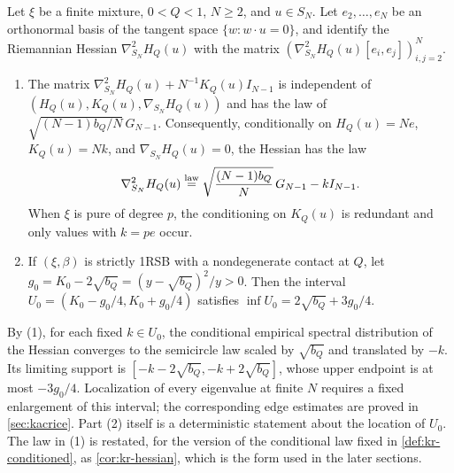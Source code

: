 \begin{lemma}\label{lem:th-hessian}
Let $\xi$ be a finite mixture, $0<Q<1$, $N\ge2$, and $u\in S_N$. Let $e_2,\dots,e_N$ be an orthonormal basis of the tangent space $\{w:w\cdot u=0\}$, and identify the Riemannian Hessian $\nabla^2_{S_N}H_Q(u)$ with the matrix $(\nabla^2_{S_N}H_Q(u)[e_i,e_j])_{i,j=2}^N$.
\begin{enumerate}
\item The matrix $\nabla^2_{S_N}H_Q(u)+N^{-1}K_Q(u)I_{N-1}$ is independent of $(H_Q(u),K_Q(u),\nabla_{S_N}H_Q(u))$ and has the law of $\sqrt{(N-1)b_Q/N}\,G_{N-1}$. Consequently, conditionally on $H_Q(u)=Ne$, $K_Q(u)=Nk$, and $\nabla_{S_N}H_Q(u)=0$, the Hessian has the law
\begin{equation}\label{eq:th-hessian-law}
\nabla^2_{S_N}H_Q(u)\overset{\rm law}=\sqrt{\frac{(N-1)b_Q}N}\,G_{N-1}-kI_{N-1}.
\end{equation}
When $\xi$ is pure of degree $p$, the conditioning on $K_Q(u)$ is redundant and only values with $k=pe$ occur.
\item If $(\xi,\beta)$ is strictly 1RSB with a nondegenerate contact at $Q$, let $g_0=K_0-2\sqrt{b_Q}=(y-\sqrt{b_Q})^2/y>0$. Then the interval $U_0=(K_0-g_0/4,K_0+g_0/4)$ satisfies $\inf U_0=2\sqrt{b_Q}+3g_0/4$.
\end{enumerate}
\end{lemma}

By (1), for each fixed $k\in U_0$, the conditional empirical spectral distribution of the Hessian converges to the semicircle law scaled by $\sqrt{b_Q}$ and translated by $-k$. Its limiting support is $[-k-2\sqrt{b_Q},-k+2\sqrt{b_Q}]$, whose upper endpoint is at most $-3g_0/4$. Localization of every eigenvalue at finite $N$ requires a fixed enlargement of this interval; the corresponding edge estimates are proved in \cref{sec:kacrice}. Part (2) itself is a deterministic statement about the location of $U_0$. The law in (1) is restated, for the version of the conditional law fixed in \cref{def:kr-conditioned}, as \cref{cor:kr-hessian}, which is the form used in the later sections.

